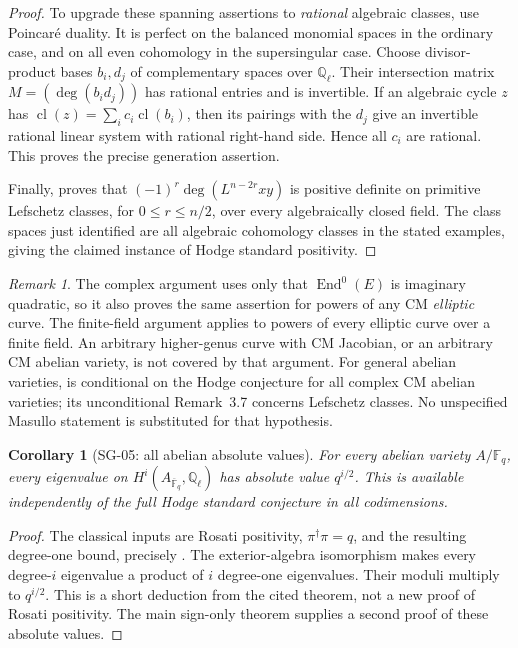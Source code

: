 \documentclass[11pt,a4paper]{article}
\newtheorem{corollary}[theorem]{Corollary}
\theoremstyle{remark}
\newtheorem{remark}[theorem]{Remark}
\begin{document}
\begin{proof}
To upgrade these spanning assertions to \emph{rational} algebraic classes, use Poincar\'e duality. It is perfect on the balanced monomial spaces in the ordinary case, and on all even cohomology in the supersingular case. Choose divisor-product bases $b_i,d_j$ of complementary spaces over $\mathbb Q_\ell$. Their intersection matrix $M=(\deg(b_i d_j))$ has rational entries and is invertible. If an algebraic cycle $z$ has
$\operatorname{cl}(z)=\sum_i c_i\operatorname{cl}(b_i)$, then its pairings with the $d_j$ give an invertible rational linear system with rational right-hand side. Hence all $c_i$ are rational. This proves the precise generation assertion.

Finally, \cite[Remark~3.7]{MilnePolarizations} proves that
$(-1)^r\deg(L^{n-2r}xy)$ is positive definite on primitive Lefschetz classes, for $0\le r\le n/2$, over every algebraically closed field. The class spaces just identified are all algebraic cohomology classes in the stated examples, giving the claimed instance of Hodge standard positivity.
\end{proof}

\begin{remark}
The complex argument uses only that $\operatorname{End}^0(E)$ is imaginary quadratic, so it also proves the same assertion for powers of any CM \emph{elliptic} curve. The finite-field argument applies to powers of every elliptic curve over a finite field. An arbitrary higher-genus curve with CM Jacobian, or an arbitrary CM abelian variety, is not covered by that argument. For general abelian varieties, \cite[Th.~3.3]{MilnePolarizations} is conditional on the Hodge conjecture for all complex CM abelian varieties; its unconditional Remark~3.7 concerns Lefschetz classes. No unspecified Masullo statement is substituted for that hypothesis.
\end{remark}

\begin{corollary}[SG-05: all abelian absolute values]
For every abelian variety $A/\mathbb F_q$, every eigenvalue on $H^i(A_{\overline{\mathbb F}_q},\mathbb Q_\ell)$ has absolute value $q^{i/2}$. This is available independently of the full Hodge standard conjecture in all codimensions.
\end{corollary}

\begin{proof}
The classical inputs are Rosati positivity, $\pi^\dagger\pi=q$, and the resulting degree-one bound, precisely \cite[Th.~13.2, Lemmas~14.2--14.3 and Th.~14.1]{MilneAV}. The exterior-algebra isomorphism \cite[Th.~11.1(b)]{MilneAV} makes every degree-$i$ eigenvalue a product of $i$ degree-one eigenvalues. Their moduli multiply to $q^{i/2}$. This is a short deduction from the cited theorem, not a new proof of Rosati positivity. The main sign-only theorem supplies a second proof of these absolute values.
\end{proof}
\end{document}
